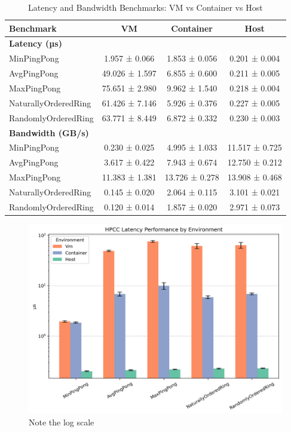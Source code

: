 \begin{table}[H]
\centering
\renewcommand{\arraystretch}{1.2}
\begin{tabular}{lccc}
\toprule
\textbf{Benchmark} & \textbf{VM} & \textbf{Container} & \textbf{Host} \\
\midrule
\multicolumn{4}{l}{\textbf{Latency (µs)}} \\
MinPingPong             & 1.957 ± 0.066 & 1.853 ± 0.056 & 0.201 ± 0.004 \\
AvgPingPong              & 49.026 ± 1.597 & 6.855 ± 0.600 & 0.211 ± 0.005 \\
MaxPingPong              & 75.651 ± 2.980 & 9.962 ± 1.540 & 0.218 ± 0.004 \\
NaturallyOrderedRing    & 61.426 ± 7.146 & 5.926 ± 0.376 & 0.227 ± 0.005 \\
RandomlyOrderedRing     & 63.771 ± 8.449 & 6.872 ± 0.332 & 0.230 ± 0.003 \\
\midrule
\multicolumn{4}{l}{\textbf{Bandwidth (GB/s)}} \\
MinPingPong            & 0.230 ± 0.025 & 4.995 ± 1.033 & 11.517 ± 0.725 \\
AvgPingPong            & 3.617 ± 0.422 & 7.943 ± 0.674 & 12.750 ± 0.212 \\
MaxPingPong            & 11.383 ± 1.381 & 13.726 ± 0.278 & 13.908 ± 0.468 \\
NaturallyOrderedRing  & 0.145 ± 0.020 & 2.064 ± 0.115 & 3.101 ± 0.021 \\
RandomlyOrderedRing   & 0.120 ± 0.014 & 1.857 ± 0.020 & 2.971 ± 0.073 \\
\bottomrule
\end{tabular}
\label{tab:pingpong}
\caption{Latency and Bandwidth Benchmarks: VM vs Container vs Host}

\end{table}

\begin{figure}[H]
    \centering
    \includegraphics[width=0.8\linewidth]{assets/hpcc_latency_performance.png}
    \caption{Note the log scale}
    \label{fig:hpcc_latency_performance}
\end{figure}

